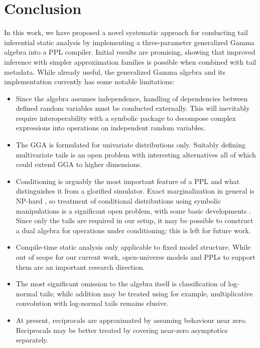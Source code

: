 \documentclass[../thesis.tex]{subfiles}
\begin{document}
\section{Conclusion}\label{sec:hta:conclusion}

In this work, we have proposed a novel systematic approach for conducting tail inferential static analysis by implementing a three-parameter generalized Gamma algebra into a PPL compiler. Initial results are promising, showing that improved inference with simpler approximation families is possible when combined with tail metadata.
While already useful, the generalized Gamma algebra and its implementation currently has
some notable limitations:
\begin{itemize}[leftmargin=*]
  \item Since the algebra assumes independence, handling of dependencies between defined random variables must be conducted externally. This will inevitably require interoperability with a symbolic package to decompose complex expressions into operations on independent random variables.
  \item The GGA is formulated for univariate distributions only. Suitably defining multivariate tails is an open problem with interesting alternatives \citep{jaini2020tails,ftvi} all of which
        could extend GGA to higher dimensions.
  \item Conditioning is arguably the most important feature of a PPL and what distinguishes it from a glorified simulator. Exact marginalization in general is NP-hard \citep{koller2009probabilistic}, so treatment of conditional distributions using symbolic manipulations is a significant open problem, with some basic developments \cite{shan2017exact,cho2019disintegration}. Since only the tails are required in our setup, it may be possible to construct a dual algebra for operations under conditioning; this is left for future work.
  \item Compile-time static analysis only applicable to fixed model structure. While out of scope for our current work, open-universe models \citep{milch2010extending}
        and PPLs to support them \citep{bingham2019pyro} are an important research direction.
  \item The most significant omission to the algebra itself is classification of log-normal tails; while addition may be treated using \cite{gulisashvili2016tail} for example, multiplicative convolution with log-normal tails remains elusive.
  \item At present, reciprocals are approximated by assuming behaviour near zero. Reciprocals may be better treated by covering near-zero asymptotics separately.
\end{itemize}
\end{document}
